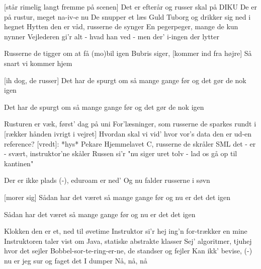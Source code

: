 \documentclass[a4paper,11pt]{article}
\begin{document}
\begin{song}
    [står rimelig langt fremme på scenen]
Det er efterår og russer skal på DIKU
De er på rustur, meget na-iv-e nu
De snupper et læs Guld Tuborg og drikker sig ned i hegnet
Hytten den er våd, russerne de synger
En pegerpeger, mange de kun nynner
Vejlederen gi'r alt - hvad han ved - men der' i-ingen der lytter

 Russerne de tigger om at få (mo)bil igen
Bubris siger,
[kommer ind fra højre] Så snart vi kommer hjem


[ih dog, de russer] Det har de spurgt om så mange gange før
og det gør de nok igen

 Det har de spurgt om så mange gange før
og det gør de nok igen


 Rusturen er væk, først' dag på uni
For'læsninger, som russerne de sparkes rundt i
[rækker hånden ivrigt i vejret] Hvordan skal vi  vid' hvor vor's data den er ud-en reference?
[vredt]: *hys* Pekare
 Hjemmelavet C, russerne de skråler
SML det - er - svært, instruktor'ne skåler
Russen si'r "nu siger uret tolv - 
lad os gå op til kantinen"


 Der er ikke plads (-), eduroam er ned'
Og nu falder russerne i søvn

[morer sig] Sådan har det været så mange gange før
og nu er det det igen

 Sådan har det været så mange gange før
og nu er det det igen



 Klokken den er et, ned til øvetime
Instruktor si'r hej
ing'n for-trækker en mine
Instruktoren taler vist om Java, statiske abstrakte klasser
Sej' algoritmer, tjuhej hvor det sejler
Bobbel-sor-te-ring-er-ne, de standser og fejler
 Kan ikk' bevise, (-) nu er jeg sur og faget det I dumper
 Nå, nå, nå


\end{song}
\end{document}
